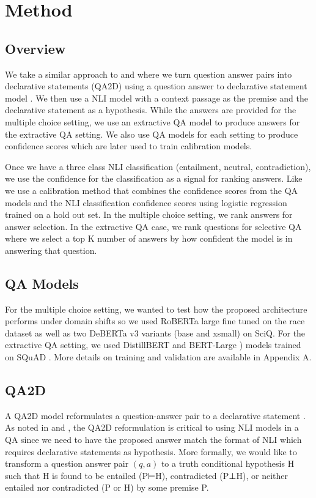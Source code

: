 \documentclass[11pt]{article}
\begin{document}
\section{Method}
\subsection{Overview}
We take a similar approach to \citet{chen_can_2021} and \citet{mishra_looking_2021} where we turn question answer pairs into declarative statements (QA2D) using a question answer to declarative statement model \citep{demszky_transforming_2018}. We then use a NLI model with a context passage as the premise and the declarative statement as a hypothesis. While the answers are provided for the multiple choice setting, we use an extractive QA model to produce answers for the extractive QA setting. We also use QA models for each setting to produce confidence scores which are later used to train calibration models.

Once we have a three class NLI classification (entailment, neutral, contradiction), we use the confidence for the classification as a signal for ranking answers. Like \citet{chen_can_2021} we use a calibration method that combines the confidence scores from the QA models and the NLI classification confidence scores using logistic regression trained on a hold out set. In the multiple choice setting, we rank answers for answer selection. In the extractive QA case, we rank questions for selective QA \citep{kamath_selective_2020} where we select a top K number of answers by how confident the model is in answering that question.
\subsection{QA Models}
For the multiple choice setting, we wanted to test how the proposed architecture performs under domain shifts so we used RoBERTa large \citep{liu_roberta_2019} fine tuned on the race dataset as well as two DeBERTa v3 \citep{he_debertav3_2021} variants (base and xsmall) on SciQ. For the extractive QA setting, we used DistillBERT \citep{sanh_distilbert_2020} and BERT-Large \citep{devlin_bert_2019}) models trained on SQuAD \citep{rajpurkar_squad_2016}. More details on training and validation are available in Appendix A.
\subsection{QA2D}
A QA2D model reformulates a question-answer pair to a declarative statement \citep{demszky_transforming_2018}. As noted in \citet{chen_can_2021} and \citet{mishra_looking_2021}, the QA2D reformulation is critical to using NLI models in a QA since we need to have the proposed answer match the format of NLI which requires declarative statements as hypothesis. More formally, we would like to transform a question answer pair $(q, a)$ to a truth conditional hypothesis H such that H is found to be entailed (P⊢H), contradicted (P⊥H), or neither entailed nor contradicted (P or H) by some premise P. 
\end{document}
